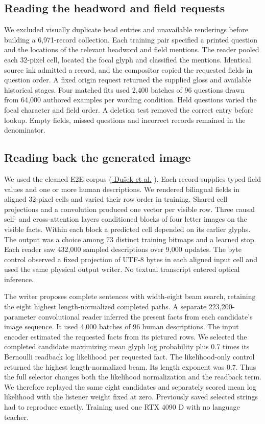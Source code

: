 \documentclass[12pt,a4paper]{article}
\providecommand{\DIFadd}[1]{{\protect\color{blue} \sf #1}} %
\begin{document}
\subsection*{\DIFadd{Reading the headword and field requests}}
\DIFadd{We excluded visually duplicate head entries and unavailable renderings before building a 6,971-record collection. Each training pair specified a printed question and the locations of the relevant headword and field mentions. The reader pooled each 32-pixel cell, located the focal glyph and classified the mentions. Identical source ink admitted a record, and the compositor copied the requested fields in question order. A fixed origin request returned the supplied gloss and available historical stages. Four matched fits used 2,400 batches of 96 questions drawn from 64,000 authored examples per wording condition. Held questions varied the focal character and field order. A deletion test removed the correct entry before lookup. Empty fields, missed questions and incorrect records remained in the denominator.
}

\subsection*{\DIFadd{Reading back the generated image}}
\DIFadd{We used the cleaned E2E corpus (}\href{https://github.com/tuetschek/e2e-cleaning}{\DIFadd{Du\v{s}ek et al.}}\DIFadd{). Each record supplies typed field values and one or more human descriptions. We rendered bilingual fields in aligned 32-pixel cells and varied their row order in training. Shared cell projections and a convolution produced one vector per visible row. Three causal self- and cross-attention layers conditioned blocks of four letter images on the visible facts. Within each block a predicted cell depended on its earlier glyphs. The output was a choice among 73 distinct training bitmaps and a learned stop. Each reader saw 432,000 sampled descriptions over 9,000 updates. The byte control observed a fixed projection of UTF-8 bytes in each aligned input cell and used the same physical output writer. No textual transcript entered optical inference.
}

\DIFadd{The writer proposes complete sentences with width-eight beam search, retaining the eight highest length-normalized completed paths. A separate 223,200-parameter convolutional reader inferred the present facts from each candidate's image sequence. It used 4,000 batches of 96 human descriptions. The input encoder estimated the requested facts from its pictured rows. We selected the completed candidate maximizing mean glyph log probability plus 0.7 times its Bernoulli readback log likelihood per requested fact. The likelihood-only control returned the highest length-normalized beam. Its length exponent was 0.7. Thus the full selector changes both the likelihood normalization and the readback term. We therefore replayed the same eight candidates and separately scored mean log likelihood with the listener weight fixed at zero. Previously saved selected strings had to reproduce exactly. Training used one RTX 4090 D with no language teacher.
}
\end{document}

